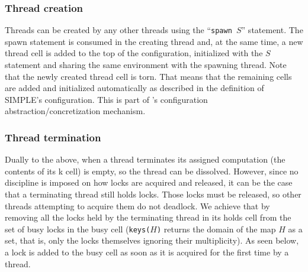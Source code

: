 \documentclass{article}
\begin{document}
\begin{kdefinition}
\begin{module}{}
\begin{kblock}[text]
 \subsubsection{Thread creation}
Threads can be created by any other threads using the ``\texttt{spawn $S$}''
statement.  The spawn statement is consumed in the creating thread and, at the
same time, a new thread cell is added to the top of the configuration,
initialized with the $S$ statement and sharing the same environment with the
spawning thread.  Note that the newly created \textsf{thread} cell is torn.
That means that the remaining cells are added and initialized automatically as
described in the definition of SIMPLE's configuration.  This is part of \K's
configuration abstraction/concretization mechanism. \end{kblock}
\begin{kblock}[text]
 \subsubsection{Thread termination}
Dually to the above, when a thread terminates its assigned computation (the
contents of its \textsf{k} cell) is empty, so the thread can be dissolved.
However, since no discipline is imposed on how locks are acquired and released,
it can be the case that a terminating thread still holds locks.  Those locks
must be released, so other threads attempting to acquire them do not deadlock.
We achieve that by removing all the locks held by the terminating thread in its
\textsf{holds} cell from the set of busy locks in the \textsf{busy} cell
(\texttt{keys($H$)} returns the domain of the map $H$ as a set, that is, only
the locks themselves ignoring their multiplicity).  As seen below, a lock is
added to the \textsf{busy} cell as soon as it is acquired for the first time
by a thread. \end{kblock}
\begin{kblock}[text]

\end{kblock}
\end{module}
\end{kdefinition}
\end{document}
